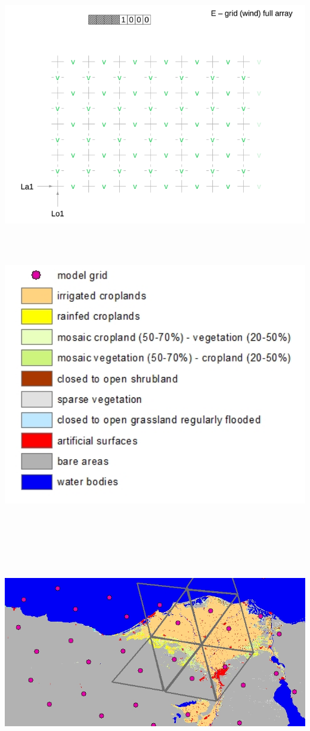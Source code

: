 {}\includegraphics[width=6.49931in,height=4.71042in]{../tex/extracted-media/media/image11.png}\includegraphics[width=6.49931in,height=4.60764in]{../tex/extracted-media/media/image12.png}\textbf{\\
}\includegraphics[width=6.49931in,height=4.62639in]{../tex/extracted-media/media/image13.png}
